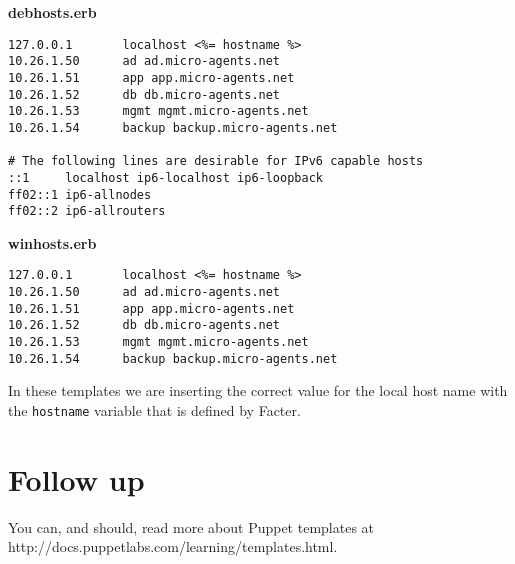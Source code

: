 \documentclass{article}   	%
\begin{document}
\textbf{debhosts.erb}
\begin{verbatim}
127.0.0.1       localhost <%= hostname %>
10.26.1.50      ad ad.micro-agents.net
10.26.1.51      app app.micro-agents.net
10.26.1.52      db db.micro-agents.net
10.26.1.53      mgmt mgmt.micro-agents.net
10.26.1.54      backup backup.micro-agents.net

# The following lines are desirable for IPv6 capable hosts
::1     localhost ip6-localhost ip6-loopback
ff02::1 ip6-allnodes
ff02::2 ip6-allrouters
\end{verbatim}


\textbf{winhosts.erb}
\begin{verbatim}
127.0.0.1       localhost <%= hostname %>
10.26.1.50      ad ad.micro-agents.net
10.26.1.51      app app.micro-agents.net
10.26.1.52      db db.micro-agents.net
10.26.1.53      mgmt mgmt.micro-agents.net
10.26.1.54      backup backup.micro-agents.net

\end{verbatim}

In these templates we are inserting the correct value for the local host name with the \texttt{hostname} variable that is defined by Facter.


\section{Follow up}
You can, and should, read more about Puppet templates at http://docs.puppetlabs.com/learning/templates.html.
\end{document}
